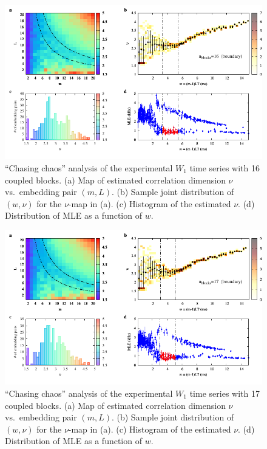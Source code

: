 \begin{appendices}
\begin{figure}[!htbp]
    \centering
    \includegraphics[width=\linewidth]{../blocks/16_blocks/2e5_points/plots/chaos_low.pdf}
    \caption{``Chasing chaos'' analysis of the experimental $W_1$ time series with 16 coupled blocks.
    (a) Map of estimated correlation dimension $\nu$ vs.\ embedding pair $(m, L)$.
    (b) Sample joint distribution of $(w,\nu)$ for the $\nu$-map in (a).
    (c) Histogram of the estimated $\nu$. (d) Distribution of MLE as a function of $w$.
    } 
\end{figure}

\begin{figure}[!htbp]
    \centering
    \includegraphics[width=\linewidth]{../blocks/17_blocks/edge/2e5_points/plots/chaos_low.pdf}
    \caption{``Chasing chaos'' analysis of the experimental $W_1$ time series with 17 coupled blocks.
    (a) Map of estimated correlation dimension $\nu$ vs.\ embedding pair $(m, L)$.
    (b) Sample joint distribution of $(w,\nu)$ for the $\nu$-map in (a).
    (c) Histogram of the estimated $\nu$. (d) Distribution of MLE as a function of $w$.
    } 
\end{figure}


\end{appendices}
